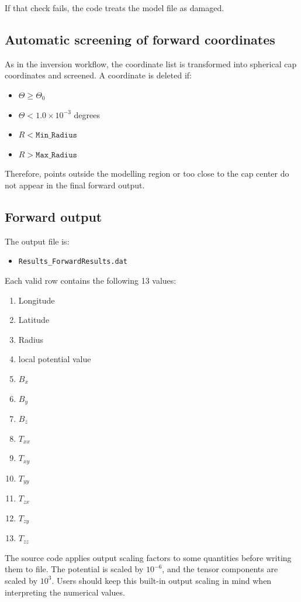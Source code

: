 \documentclass[11pt,a4paper]{article}
\begin{document}
If that check fails, the code treats the model file as damaged.

\subsection{Automatic screening of forward coordinates}

As in the inversion workflow, the coordinate list is transformed into spherical cap coordinates and screened. A coordinate is deleted if:
\begin{itemize}
  \item $\Theta \ge \Theta_0$
  \item $\Theta < 1.0 \times 10^{-3}$ degrees
  \item $R < \texttt{Min\_Radius}$
  \item $R > \texttt{Max\_Radius}$
\end{itemize}

Therefore, points outside the modelling region or too close to the cap center do not appear in the final forward output.

\subsection{Forward output}

The output file is:
\begin{itemize}
  \item \texttt{Results\_ForwardResults.dat}
\end{itemize}

Each valid row contains the following 13 values:
\begin{enumerate}
  \item Longitude
  \item Latitude
  \item Radius
  \item local potential value
  \item $B_x$
  \item $B_y$
  \item $B_z$
  \item $T_{xx}$
  \item $T_{xy}$
  \item $T_{yy}$
  \item $T_{zx}$
  \item $T_{zy}$
  \item $T_{zz}$
\end{enumerate}

The source code applies output scaling factors to some quantities before writing them to file. The potential is scaled by $10^{-6}$, and the tensor components are scaled by $10^{3}$. Users should keep this built-in output scaling in mind when interpreting the numerical values.
\end{document}
